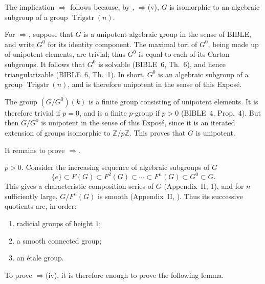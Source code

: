 
The implication \(\Rightarrow\) follows because, by
, \(\Rightarrow\)(v), \(G\) is isomorphic to an algebraic
subgroup of a group \(\operatorname{Trigstr}(n)\).

For \(\Rightarrow\), suppose that \(G\) is a unipotent
algebraic group in the sense of BIBLE, and write \(G^0\) for its
identity component.  The maximal tori of \(G^0\), being made up of
unipotent elements, are trivial; thus \(G^0\) is equal to each of its
Cartan subgroups.  It follows that \(G^0\) is solvable
(BIBLE~6, Th.~6), and hence triangularizable
(BIBLE~6, Th.~1).  In short, \(G^0\) is an algebraic subgroup of a
group \(\operatorname{Trigstr}(n)\), and is therefore unipotent in
the sense of this Exposé.

The group \((G/G^0)(k)\) is a finite group consisting of unipotent
elements.  It is therefore trivial if \(p=0\), and is a finite
\(p\)-group if \(p>0\) (BIBLE~4, Prop.~4).  But then \(G/G^0\) is
unipotent in the sense of this Exposé, since it is an iterated
extension of groups isomorphic to \(\mathbb Z/p\mathbb Z\).  This
proves that \(G\) is unipotent.

It remains to prove \(\Rightarrow\).

\smallskip
\noindent\textit{ \(p>0\).}\quad
Consider the increasing sequence of algebraic subgroups of \(G\)
\[
  \{e\}\subset F(G)\subset F^2(G)\subset\cdots\subset
  F^n(G)\subset G^0\subset G.
\]
This gives a characteristic composition series of \(G\)
(Appendix~II, 1), and for \(n\) sufficiently large,
\(G/F^n(G)\) is smooth (Appendix~II, ).  Thus its successive
quotients are, in order:
\begin{enumerate}
\item[(1)] radicial groups of height \(1\);
\item[(2)] a smooth connected group;
\item[(3)] an étale group.
\end{enumerate}
To prove \(\Rightarrow\)(iv), it is therefore enough to prove the
following lemma.

